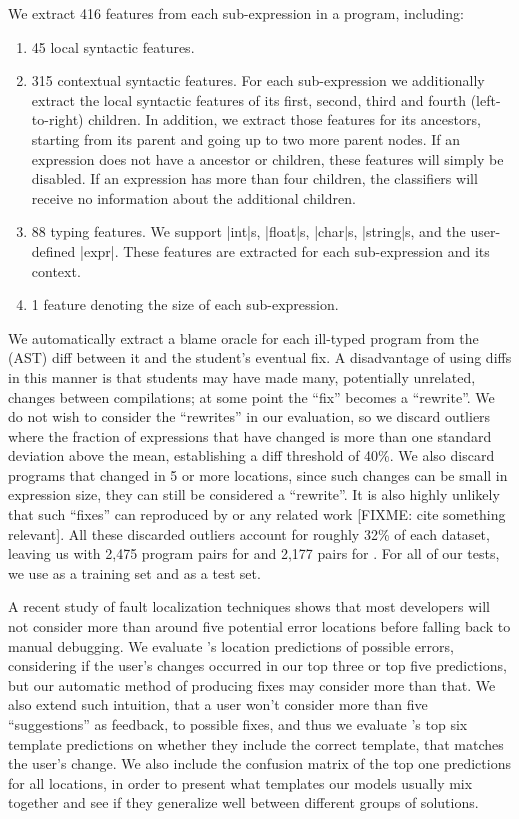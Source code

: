 We extract 416 features from each sub-expression in a
program, including:
%
\begin{enumerate}
  \item 45 local syntactic features.
  \item 315 contextual syntactic features. For each sub-expression we
    additionally extract the local syntactic features of its first, second,
    third and fourth (left-to-right) children. In addition, we extract those
    features for its ancestors, starting from its parent and going up to two
    more parent nodes. If an expression does not have a ancestor or children,
    these features will simply be disabled. If an expression has more than four
    children, the classifiers will receive no information about the additional
    children.
  \item 88 typing features. We support |int|s, |float|s, |char|s, |string|s, and
    the user-defined |expr|. These features are extracted for each
    sub-expression and its context.
  \item 1 feature denoting the size of each sub-expression.
\end{enumerate}

We automatically extract a blame oracle for each ill-typed program from the
(AST) diff between it and the student's eventual fix. A disadvantage of using
diffs in this manner is that students may have made many, potentially unrelated,
changes between compilations; at some point the ``fix'' becomes a ``rewrite''.
We do not wish to consider the ``rewrites'' in our evaluation, so we discard
outliers where the fraction of expressions that have changed is more than one
standard deviation above the mean, establishing a diff threshold of 40\%. We
also discard programs that changed in 5 or more locations, since such changes
can be small in expression size, they can still be considered a ``rewrite''. It
is also highly unlikely that such ``fixes'' can reproduced by \toolname or any
related work [FIXME: cite something relevant]. All these discarded outliers
account for roughly 32\% of each dataset, leaving us with 2,475 program pairs
for \SPRING and 2,177 pairs for \FALL. For all of our tests, we use \SPRING as a
training set and \FALL as a test set.

A recent study of fault localization techniques \citep[][]{Kochhar2016-oc} shows
that most developers will not consider more than around five potential error
locations before falling back to manual debugging. We evaluate \toolname's
location predictions of possible errors, considering if the user's changes
occurred in our top three or top five predictions, but our automatic method of
producing fixes may consider more than that. We also extend such intuition, that
a user won't consider more than five ``suggestions'' as feedback, to possible
fixes, and thus we evaluate \toolname's top six template predictions on whether
they include the correct template, that matches the user's change. We also
include the confusion matrix of the top one predictions for all locations, in
order to present what templates our models usually mix together and see if they
generalize well between different groups of solutions.

